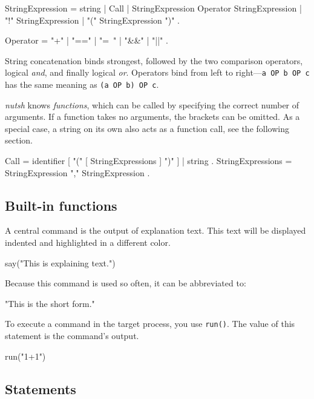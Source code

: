 \documentclass[paper=a4,twoside,abstract=on,cleardoublepage=empty,numbers=noenddot,toc=bib,12pt]{scrreprt}
\begin{document}
\begin{ebnf}
StringExpression =
        string | Call | StringExpression Operator StringExpression |
        "!" StringExpression | "(" StringExpression ")" .

Operator = "+" | "==" | "=~" | "&&" | "||" .
\end{ebnf}


String concatenation binds strongest, followed by the two comparison operators, logical \emph{and}, and finally logical \emph{or}. Operators bind from left to right---\texttt{a OP b OP c} has the same meaning as \texttt{(a OP b) OP c}.


\emph{nutsh} knows \emph{functions}, which can be called by specifying the correct number of arguments. If a function takes no arguments, the brackets can be omitted. As a special case, a string on its own also acts as a function call, see the following section.

\begin{ebnf}
Call = identifier [ "(" [ StringExpressions ] ")" ] |
        string .
StringExpressions = StringExpression { "," StringExpression } .
\end{ebnf}

\subsection{Built-in functions}

A central command is the output of explanation text. This text will be displayed indented and highlighted in a different color.

\begin{nutsh}
say("This is explaining text.")
\end{nutsh}
%
Because this command is used so often, it can be abbreviated to:

\begin{nutsh}
"This is the short form."
\end{nutsh}
%
To execute a command in the target process, you use \texttt{run()}. The value of this statement is the command's output.

\begin{nutsh}
run("1+1")
\end{nutsh}

\subsection{Statements}
\label{sec:statements}
\end{document}
